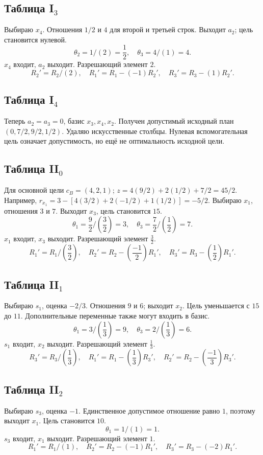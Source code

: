 \documentclass[12pt,a4paper]{article}
\begin{document}
\subsection*{Таблица I$_{3}$}
Выбираю $x_4$. Отношения $1/2$ и $4$ для второй и третьей строк. Выходит $a_2$; цель становится нулевой.
\[\theta_{2}=1/(2)=\frac{1}{2},\quad \theta_{3}=4/(1)=4.\]
$x_{4}$ входит, $a_{2}$ выходит. Разрешающий элемент $2$.
\[R_{2}'=R_{2}/(2),\quad R_{1}'=R_{1}-(-1)R_{2}',\quad R_{3}'=R_{3}-(1)R_{2}'.\]
\subsection*{Таблица I$_{4}$}
Теперь $a_2=a_3=0$, базис $x_3,x_4,x_2$. Получен допустимый исходный план $(0,7/2,9/2,1/2)$. Удаляю искусственные столбцы. Нулевая вспомогательная цель означает допустимость, но ещё не оптимальность исходной цели.
\subsection*{Таблица II$_{0}$}
Для основной цели $c_B=(4,2,1)$; $z=4(9/2)+2(1/2)+7/2=45/2$. Например, $r_{x_1}=3-[4(3/2)+2(-1/2)+1(1/2)]=-5/2$. Выбираю $x_1$, отношения $3$ и $7$. Выходит $x_3$, цель становится $15$.
\[\theta_{1}=\frac{9}{2}/(\frac{3}{2})=3,\quad \theta_{3}=\frac{7}{2}/(\frac{1}{2})=7.\]
$x_{1}$ входит, $x_{3}$ выходит. Разрешающий элемент $\frac{3}{2}$.
\[R_{1}'=R_{1}/(\frac{3}{2}),\quad R_{2}'=R_{2}-(\frac{-1}{2})R_{1}',\quad R_{3}'=R_{3}-(\frac{1}{2})R_{1}'.\]
\subsection*{Таблица II$_{1}$}
Выбираю $s_1$, оценка $-2/3$. Отношения $9$ и $6$; выходит $x_2$. Цель уменьшается с $15$ до $11$. Дополнительные переменные также могут входить в базис.
\[\theta_{1}=3/(\frac{1}{3})=9,\quad \theta_{3}=2/(\frac{1}{3})=6.\]
$s_{1}$ входит, $x_{2}$ выходит. Разрешающий элемент $\frac{1}{3}$.
\[R_{3}'=R_{3}/(\frac{1}{3}),\quad R_{1}'=R_{1}-(\frac{1}{3})R_{3}',\quad R_{2}'=R_{2}-(\frac{-1}{3})R_{3}'.\]
\subsection*{Таблица II$_{2}$}
Выбираю $s_3$, оценка $-1$. Единственное допустимое отношение равно $1$, поэтому выходит $x_1$. Цель становится $10$.
\[\theta_{1}=1/(1)=1.\]
$s_{3}$ входит, $x_{1}$ выходит. Разрешающий элемент $1$.
\[R_{1}'=R_{1}/(1),\quad R_{2}'=R_{2}-(-1)R_{1}',\quad R_{3}'=R_{3}-(-2)R_{1}'.\]
\end{document}
